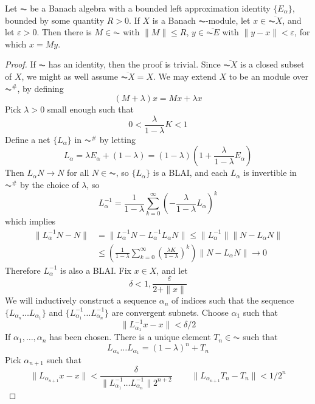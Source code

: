\begin{theorem}
    Let $\AC$ be a Banach algebra with a bounded left approximation identity $\{ E_\alpha \}$, bounded by some quantity $R > 0$. If $X$ is a Banach $\AC$-module, let $x \in \overline{\AC X}$, and let $\varepsilon > 0$. Then there is $M \in \AC$ with $\| M \| \leq R$, $y \in \overline{\AC E}$ with $\| y - x \| < \varepsilon$, for which $x = My$.
\end{theorem}
\begin{proof}
    If $\AC$ has an identity, then the proof is trivial. Since $\overline{\AC X}$ is a closed subset of $X$, we might as well assume $\overline{\AC X} = X$. We may extend $X$ to be an module over $\AC^\#$, by defining
    \[ (M + \lambda) x = Mx + \lambda x \]
    Pick $\lambda > 0$ small enough such that
    \[ 0 < \frac{\lambda}{1 - \lambda} K < 1 \]
    Define a net $\{ L_\alpha \}$ in $\AC^\#$ by letting
    \[ L_\alpha = \lambda E_\alpha + (1 - \lambda) = (1 - \lambda) \left( 1 + \frac{\lambda}{1 - \lambda} E_\alpha \right) \]
    Then $L_\alpha N \to N$ for all $N \in \AC$, so $\{ L_\alpha \}$ is a BLAI, and each $L_\alpha$ is invertible in $\AC^\#$ by the choice of $\lambda$, so
    \[ L_\alpha^{-1} = \frac{1}{1 - \lambda} \sum_{k = 0}^\infty \left(- \frac{\lambda}{1 - \lambda} L_\alpha \right)^k \]
    which implies
    \begin{align*}
        \| L_\alpha^{-1} N - N \| &= \| L_\alpha^{-1} N - L_\alpha^{-1} L_\alpha N \| \leq \| L_\alpha^{-1} \| \| N - L_\alpha N \|\\
        &\leq \left( \frac{1}{1 - \lambda} \sum_{k = 0}^\infty \left( \frac{\lambda K}{1 - \lambda} \right)^k \right) \| N - L_\alpha N \| \to 0
    \end{align*}
    Therefore $L_\alpha^{-1}$ is also a BLAI. Fix $x \in X$, and let
    \[ \delta < 1, \frac{\varepsilon}{2 + \|x\|} \]
    We will inductively construct a sequence $\alpha_n$ of indices such that the sequence $\{ L_{\alpha_n} \dots L_{\alpha_1} \}$ and $\{ L_{\alpha_1}^{-1} \dots L_{\alpha_n}^{-1} \}$ are convergent subnets. Choose $\alpha_1$ such that
    \[ \| L_{\alpha_1}^{-1} x - x \| < \delta/2 \]
    If $\alpha_1, \dots, \alpha_n$ has been chosen. There is a unique element $T_n \in \AC$ such that
    \[  L_{\alpha_n} \dots L_{\alpha_1} = (1 - \lambda)^n + T_n \]
    Pick $\alpha_{n+1}$ such that
    \[ \| L_{\alpha_{n+1}} x - x \| < \frac{\delta}{\| L_{\alpha_1}^{-1} \dots L_{\alpha_n}^{-1} \| 2^{n+2}}\ \ \ \ \ \ \ \ \ \ \| L_{\alpha_{n+1}} T_n - T_n \| < 1/2^n \]

\end{proof}
